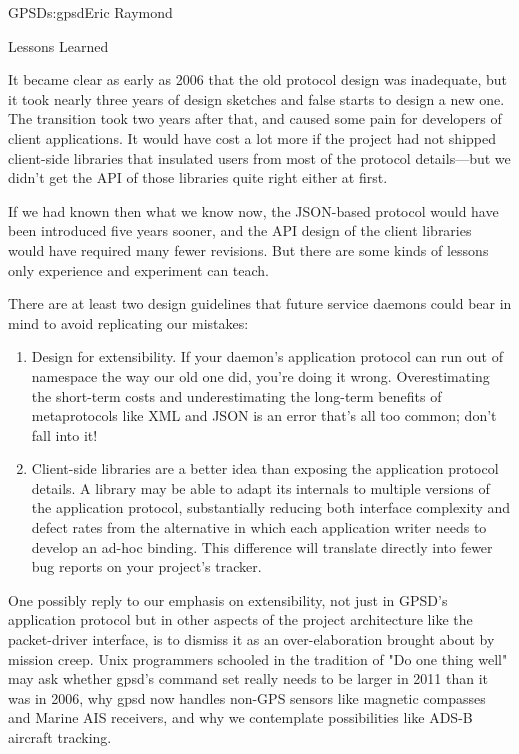 \begin{aosachapter}{GPSD}{s:gpsd}{Eric Raymond}
\begin{aosasect1}{Lessons Learned}
\begin{enumerate}
\end{enumerate}

It became clear as early as 2006 that the old protocol design was
inadequate, but it took nearly three years of design sketches and 
false starts to design a new one.  The transition took two years
after that, and caused some pain for developers of client applications.
It would have cost a lot more if the project had not shipped client-side
libraries that insulated users from most of the protocol details---but
we didn't get the API of those libraries quite right either at first.

If we had known then what we know now, the JSON-based protocol would
have been introduced five years sooner, and the API design of the client
libraries would have required many fewer revisions. But there are
some kinds of lessons only experience and experiment can teach.

There are at least two design guidelines that future service daemons
could bear in mind to avoid replicating our mistakes:

\begin{enumerate}

  \item Design for extensibility.  If your daemon's application
    protocol can run out of namespace the way our old one did, you're
    doing it wrong. Overestimating the short-term costs and
    underestimating the long-term benefits of metaprotocols like XML
    and JSON is an error that's all too common; don't fall into it!

  \item Client-side libraries are a better idea than exposing the
    application protocol details. A library may be able to adapt its
    internals to multiple versions of the application protocol,
    substantially reducing both interface complexity and defect rates
    from the alternative in which each application writer needs to
    develop an ad-hoc binding.  This difference will translate
    directly into fewer bug reports on your project's tracker.

\end{enumerate}

One possibly reply to our emphasis on extensibility, not just in
GPSD's application protocol but in other aspects of the project
architecture like the packet-driver interface, is to dismiss it as an
over-elaboration brought about by mission creep.  Unix programmers
schooled in the tradition of "Do one thing well" may ask whether 
gpsd's command set really needs to be larger in 2011 than it was in
2006, why gpsd now handles non-GPS sensors like magnetic compasses
and Marine AIS receivers, and why we contemplate possibilities like
ADS-B aircraft tracking. 


\end{aosasect1}
\end{aosachapter}
